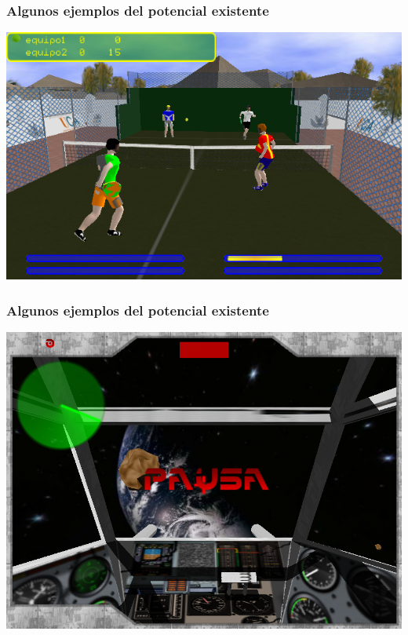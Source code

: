 
\begin{frame}
	\frametitle{Algunos ejemplos del potencial existente}
	
	\begin{center}
		\includegraphics[scale=0.45]{img/freepadel.png}
	\end{center}

\end{frame}


\begin{frame}
	\frametitle{Algunos ejemplos del potencial existente}
	
	\begin{center}
		\includegraphics[scale=0.30]{img/avion.png}
	\end{center}

\end{frame}

